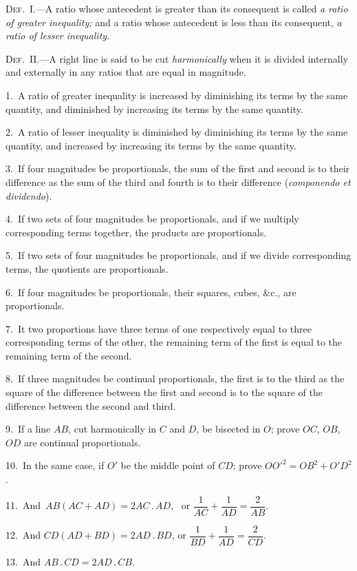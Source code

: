 \documentclass[oneside]{book}
\begin{document}
\begin{footnotesize}
\textsc{Def.~I.}---A ratio whose antecedent is greater than its consequent
is called \emph{a ratio of greater inequality;} and a ratio whose
antecedent is less than its consequent, \emph{a ratio of lesser inequality.}

\textsc{Def.~II\@.}---A right line is said to be cut \emph{harmonically} when it is
divided internally and externally in any ratios that are equal in
magnitude.

1.~A ratio of greater inequality is increased by diminishing its
terms by the same quantity, and diminished by increasing its
terms by the same quantity.

2.~A ratio of lesser inequality is diminished by diminishing its
terms by the same quantity, and increased by increasing its terms
by the same quantity.

3.~If four magnitudes be proportionals, the sum of the first and
second is to their difference as the sum of the third and fourth is
to their difference (\emph{componendo et dividendo}).

4.~If two sets of four magnitudes be proportionals, and if we
multiply corresponding terms together, the products are proportionals.

5.~If two sets of four magnitudes be proportionals, and if we
divide corresponding terms, the quotients are proportionals.

6.~If four magnitudes be proportionals, their squares, cubes,
\&c., are proportionals.

7.~It two proportions have three terms of one respectively
equal to three corresponding terms of the other, the remaining
term of the first is equal to the remaining term of the second.

8.~If three magnitudes be continual proportionals, the first is
to the third as the square of the difference between the first and
second is to the square of the difference between the second and
third.

9.~If a line $AB$, cut harmonically in $C$ and $D$, be bisected in
$O$; prove $OC$, $OB$, $OD$ are continual proportionals.

10.~In the same case, if $O'$ be the middle point of $CD$; prove
$OO'^2 = OB^2 + O'D^2$.

11.~And \,$AB (AC + AD) = 2AC\,.\,AD$, \ or
$\dfrac{1}{AC}+\dfrac{1}{AD}=\dfrac{2}{AB}$.

12.~And $CD (AD + BD) = 2AD\,.\,BD$, or
$\dfrac{1}{BD}+\dfrac{1}{AD}=\dfrac{2}{CD}$.

13.~And $AB\,.\,CD = 2AD\,.\,CB$.
\par\end{footnotesize}
\end{document}
